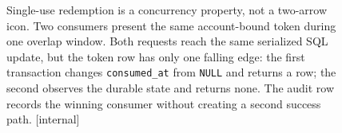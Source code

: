\begin{figure}[H]
\caption{Single-use redemption is a concurrency property, not a two-arrow
icon. Two consumers present the same account-bound token during one overlap
window. Both requests reach the same serialized SQL update, but the token
row has only one falling edge: the first transaction changes
\texttt{consumed\_at} from \texttt{NULL} and returns a row; the second
observes the durable state and returns none. The audit row records the
winning consumer without creating a second success path. [internal]}
\label{fig:magic-link-inline}
\end{figure}
